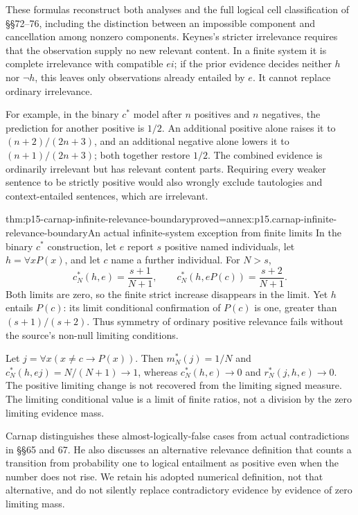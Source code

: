 These formulas reconstruct both analyses and the full logical cell
classification of §§72--76, including the distinction between an
impossible component and cancellation among nonzero components.
Keynes's stricter irrelevance requires that the observation supply no
new relevant content. In a finite system it is complete irrelevance
with compatible \(ei\); if the prior evidence decides neither
\(h\) nor \(\neg h\), this leaves only observations already
entailed by \(e\). It cannot replace ordinary irrelevance.

For example, in the binary \(c^*\) model after \(n\) positives
and \(n\) negatives, the prediction for another positive is \(1/2\).
An additional positive alone raises it to \((n+2)/(2n+3)\), and
an additional negative alone lowers it to \((n+1)/(2n+3)\); both
together restore \(1/2\). The combined evidence is ordinarily
irrelevant but has relevant content parts. Requiring every weaker
sentence to be strictly positive would also wrongly exclude tautologies
and context-entailed sentences, which are irrelevant.

\begin{hbtheorem}{thm:p15-carnap-infinite-relevance-boundary}{proved=annex:p15.carnap-infinite-relevance-boundary}{An actual infinite-system exception from finite limits}
In the binary \(c^*\) construction, let \(e\) report \(s\)
positive named individuals, let \(h=\forall xP(x)\), and let
\(c\) name a further individual. For \(N>s\),
\[
 c_N^*(h,e)=\frac{s+1}{N+1},\qquad
 c_N^*(h,eP(c))=\frac{s+2}{N+1}.
\]
Both limits are zero, so the finite strict increase disappears in the
limit. Yet \(h\) entails \(P(c)\): its limit conditional
confirmation of \(P(c)\) is one, greater than
\((s+1)/(s+2)\). Thus symmetry of ordinary positive relevance
fails without the source's non-null limiting conditions.

Let \(j=\forall x(x\ne c\to P(x))\). Then
\(m_N^*(j)=1/N\) and \(c_N^*(h,ej)=N/(N+1)\to1\), whereas
\(c_N^*(h,e)\to0\) and \(r_N^*(j,h,e)\to0\).
The positive limiting change is not recovered from the limiting signed
measure. The limiting conditional value is a limit of finite ratios,
not a division by the zero limiting evidence mass.
\end{hbtheorem}

Carnap distinguishes these almost-logically-false cases from actual
contradictions in §§65 and 67. He also discusses an alternative relevance
definition that counts a transition from probability one to logical
entailment as positive even when the number does not rise. We retain
his adopted numerical definition, not that alternative, and do not
silently replace contradictory evidence by evidence of zero limiting mass.

